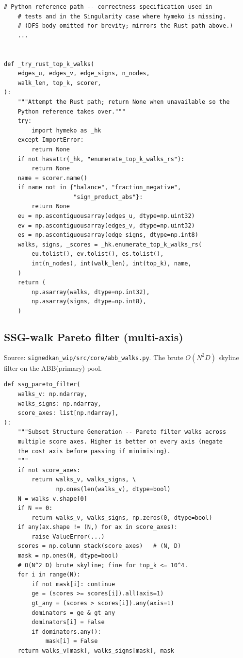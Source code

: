 \documentclass[11pt]{article}
\begin{document}
\begin{lstlisting}[style=pythonstyle]
    # Python reference path -- correctness specification used in
    # tests and in the Singularity case where hymeko is missing.
    # (DFS body omitted for brevity; mirrors the Rust path above.)
    ...


def _try_rust_top_k_walks(
    edges_u, edges_v, edge_signs, n_nodes,
    walk_len, top_k, scorer,
):
    """Attempt the Rust path; return None when unavailable so the
    Python reference takes over."""
    try:
        import hymeko as _hk
    except ImportError:
        return None
    if not hasattr(_hk, "enumerate_top_k_walks_rs"):
        return None
    name = scorer.name()
    if name not in {"balance", "fraction_negative",
                    "sign_product_abs"}:
        return None
    eu = np.ascontiguousarray(edges_u, dtype=np.uint32)
    ev = np.ascontiguousarray(edges_v, dtype=np.uint32)
    es = np.ascontiguousarray(edge_signs, dtype=np.int8)
    walks, signs, _scores = _hk.enumerate_top_k_walks_rs(
        eu.tolist(), ev.tolist(), es.tolist(),
        int(n_nodes), int(walk_len), int(top_k), name,
    )
    return (
        np.asarray(walks, dtype=np.int32),
        np.asarray(signs, dtype=np.int8),
    )
\end{lstlisting}

\subsection{SSG-walk Pareto filter (multi-axis)}
\label{app:code-ssg-walk}

Source: \texttt{signedkan\_wip/src/core/abb\_walks.py}. The brute
$O(N^2 D)$ skyline filter on the ABB(primary) pool.

\begin{lstlisting}[style=pythonstyle]
def ssg_pareto_filter(
    walks_v: np.ndarray,
    walks_signs: np.ndarray,
    score_axes: list[np.ndarray],
):
    """Subset Structure Generation -- Pareto filter walks across
    multiple score axes. Higher is better on every axis (negate
    the cost axis before passing if minimising).
    """
    if not score_axes:
        return walks_v, walks_signs, \
               np.ones(len(walks_v), dtype=bool)
    N = walks_v.shape[0]
    if N == 0:
        return walks_v, walks_signs, np.zeros(0, dtype=bool)
    if any(ax.shape != (N,) for ax in score_axes):
        raise ValueError(...)
    scores = np.column_stack(score_axes)   # (N, D)
    mask = np.ones(N, dtype=bool)
    # O(N^2 D) brute skyline; fine for top_k <= 10^4.
    for i in range(N):
        if not mask[i]: continue
        ge = (scores >= scores[i]).all(axis=1)
        gt_any = (scores > scores[i]).any(axis=1)
        dominators = ge & gt_any
        dominators[i] = False
        if dominators.any():
            mask[i] = False
    return walks_v[mask], walks_signs[mask], mask
\end{lstlisting}
\end{document}
